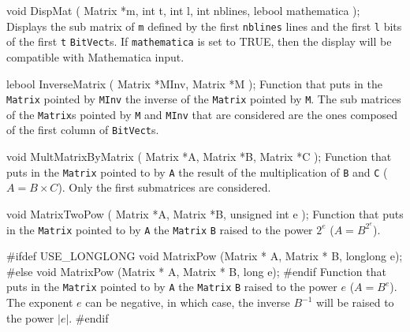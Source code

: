 void DispMat ( Matrix *m, 
               int t, 
               int l,
               int nblines,
               lebool mathematica
            );
\endcode
 \tab
Displays the sub matrix of {\tt *m} defined by the first {\tt nblines} lines and the first {\tt l} bits of the first
{\tt t} {\tt BitVect}s.  If {\tt mathematica} is set to TRUE, then the display will be compatible with
Mathematica input.
 \endtab
\code 


lebool InverseMatrix ( Matrix *MInv, 
                        Matrix *M
                      );
\endcode
\tab
Function that puts in the {\tt Matrix} pointed by {\tt MInv} the inverse of the {\tt Matrix} pointed by {\tt M}.
The sub matrices of the {\tt Matrix}s pointed by {\tt M} and {\tt MInv} that are considered are the ones composed of 
the first column of {\tt BitVect}s.
\endtab
\code


void MultMatrixByMatrix ( Matrix *A, 
                          Matrix *B,
                          Matrix *C
                        );
\endcode
\tab
Function that puts in the {\tt Matrix} pointed to by {\tt A} the result of the
multiplication of {\tt B} and {\tt C} ($A = B \times C$).
Only the first submatrices are considered.
\endtab
\code


void MatrixTwoPow ( Matrix *A, 
                    Matrix *B,
                    unsigned int e
                  );
\endcode
\tab
Function that puts in the {\tt Matrix} pointed to by {\tt A} the {\tt Matrix} 
{\tt B} raised to the power $2^{e}$ ($A = B^{2^{e}}$).
\endtab
\code

#ifdef USE_LONGLONG
   void MatrixPow (Matrix * A, Matrix * B, longlong e);
#else
   void MatrixPow (Matrix * A, Matrix * B, long e);
#endif
\endcode
\tab
Function that puts in the {\tt Matrix} pointed to by {\tt A} the {\tt Matrix} 
{\tt B} raised to the power $e$ ($A = B^{e}$). 
The exponent $e$ can be negative, in which case, the inverse $B^{-1}$
 will be raised to the power $|e|$.
\endtab
\code
\hide
#endif
\endhide
\endcode
